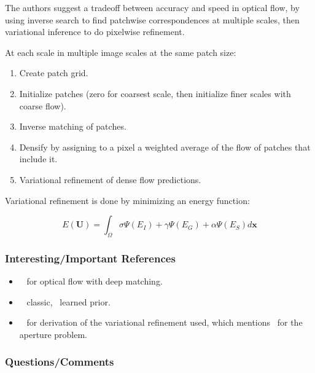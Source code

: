 \documentclass[a4paper, 12pt]{article}
\begin{document}
The authors suggest a tradeoff between accuracy and speed in optical flow, by
using inverse search to find patchwise correspondences at multiple scales, then
variational inference to do pixelwise refinement.

At each scale in multiple image scales at the same patch size:

\begin{enumerate}
        \item Create patch grid.

        \item Initialize patches (zero for coarsest scale, then initialize
                finer scales with coarse flow).

        \item Inverse matching of patches.

        \item Densify by assigning to a pixel a weighted average of the flow of
                patches that include it.

        \item Variational refinement of dense flow predictions.
\end{enumerate}

Variational refinement is done by minimizing an energy function:

\begin{equation*}
E(\mathbf{U}) = \int_\Omega \sigma\Psi(E_I) + \gamma\Psi(E_G) + \alpha\Psi(E_S) d\mathbf{x}
\end{equation*}


\subsubsection{Interesting/Important References}

\begin{itemize}
        \item~\cite{weinzaepfel2013deepflow} for optical flow with deep matching.

        \item~\cite{brox2011large} classic,~\cite{wulff2015efficient} learned
                prior.

        \item~\cite{zimmer2011optic} for derivation of the variational
                refinement used, which mentions~\cite{bertero1988illposed} for
                the aperture problem.
\end{itemize}


\subsubsection{Questions/Comments}
\end{document}
